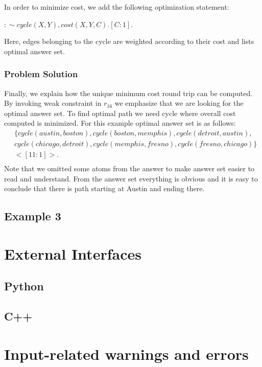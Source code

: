 \documentclass[14pt,a4paper, titlepage]{article}
\begin{document}
In order to minimize cost, we add the following optimization statement: \\
\centerline{$:\sim cycle(X,Y), cost(X,Y,C). [C:1].$}
Here, edges belonging to the cycle are weighted according to their cost and \dlvhex{} lists optimal answer set.

\subsubsection{Problem Solution}
Finally, we explain how the unique minimum cost round trip 
can be computed. By invoking weak constraint in $r_{16}$ we  
emphasize that we are looking for the optimal answer set. To find optimal path we need cycle where overall cost computed is minimized. For this example optimal answer set is as follows:
\begin{align*}
& \{ cycle(austin,boston), cycle(boston,memphis),cycle(detroit,austin), \\
& cycle(chicago,detroit), cycle(memphis,fresno),cycle(fresno,chicago) \} \\
& <[11:1]>. \\
\end{align*}
Note that we omitted some atoms from the answer to make answer set easier to read and understand.
From the answer set everything is obvious and it is easy to conclude that there is path starting at Austin and ending there. 




\subsection{Example 3}
\label{example3}

\section{External Interfaces}
\label{sec:externalInterfaces}
\subsection{Python}
\subsection{C++}

\section{Input-related warnings and errors}
\label{sec:inputRelatedWarnings}
\end{document}
